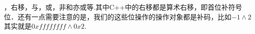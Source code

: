     
，右移，与，或，非和亦或等.其中C++中的右移都是算术右移，即首位补符号位．还有一点需要注意的是，我们的这些位操作的操作对象都是补码，比如$-1 \land 2$其实就是$0xffffffff \land 0x2$.
